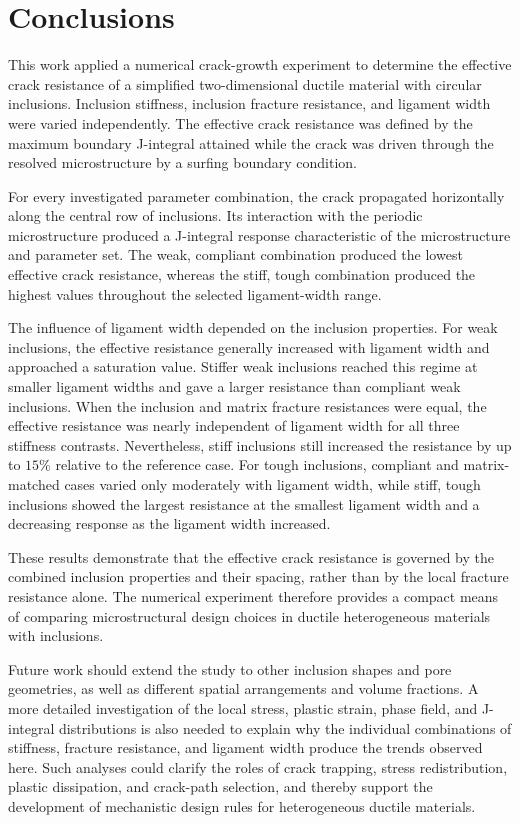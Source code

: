 \documentclass[pamm,a4paper,fleqn]{w-art}
\begin{document}
\section{Conclusions}\label{sec:conclusions}

This work applied a numerical crack-growth experiment to determine
the effective crack resistance of a simplified two-dimensional
ductile material with circular inclusions. Inclusion stiffness,
inclusion fracture resistance, and ligament width were varied
independently. The effective crack resistance was defined by the
maximum boundary J-integral attained while the crack was driven
through the resolved microstructure by a surfing boundary condition.

For every investigated parameter combination, the crack propagated
horizontally along the central row of inclusions. Its interaction
with the periodic microstructure produced a J-integral
response characteristic of the microstructure and parameter set. The
weak, compliant combination produced the lowest effective crack
resistance, whereas the stiff, tough combination produced the highest
values throughout the selected ligament-width range.

The influence of ligament width depended on the inclusion
properties. For weak inclusions, the effective resistance generally
increased with ligament width and approached a saturation value.
Stiffer weak inclusions reached this regime at smaller ligament
widths and gave a larger resistance than compliant weak inclusions.
When the inclusion and matrix fracture resistances were equal, the
effective resistance was nearly independent of ligament width for
all three stiffness contrasts. Nevertheless, stiff inclusions still
increased the resistance by up to \(15\%\) relative to the reference
case. For tough inclusions, compliant and matrix-matched cases varied
only moderately with ligament width, while stiff, tough inclusions
showed the largest resistance at the smallest ligament width and a
decreasing response as the ligament width increased.

These results demonstrate that the effective crack resistance is
governed by the combined inclusion properties and their spacing,
rather than by the local fracture resistance alone. The numerical
experiment therefore provides a compact means of comparing
microstructural design choices in ductile heterogeneous materials
with inclusions.

Future work should extend the study to other inclusion shapes and
pore geometries, as well as different spatial arrangements and volume
fractions. A more detailed investigation of the local stress, plastic
strain, phase field, and J-integral distributions is also needed to
explain why the individual combinations of stiffness, fracture
resistance, and ligament width produce the trends observed here. Such
analyses could clarify the roles of crack trapping, stress
redistribution, plastic dissipation, and crack-path selection, and
thereby support the development of mechanistic design rules for
heterogeneous ductile materials.
\end{document}
